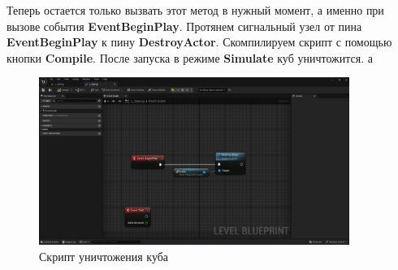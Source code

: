 Теперь остается только вызвать этот метод в нужный момент, а именно при вызове события \textbf{EventBeginPlay}. Протянем сигнальный узел от пина \textbf{EventBeginPlay} к пину \textbf{DestroyActor}. Скомпилируем скрипт с помощью кнопки \textbf{Compile}. После запуска в режиме \textbf{Simulate} куб уничтожится.
а
\begin{figure}[h]
    \centering
    \includegraphics[width=0.9\textwidth]{Lections/DestroyCubeBeginPlay.png}
    \caption{Скрипт уничтожения куба}
\end{figure}


